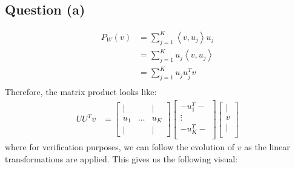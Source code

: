 \documentclass[12pt]{article}
\begin{document}
\subsection{Question (a)}
\begin{align*}
    P_{W}(v)
     & = \sum_{j=1}^{K} \left\langle v, u_{j} \right\rangle u_{j} \\
     & = \sum_{j=1}^{K} u_{j} \left\langle v, u_{j} \right\rangle \\
     & = \sum_{j=1}^{K} u_{j} u_{j}^T v                           \\
\end{align*}
Therefore, the matrix product looks like:
\begin{align*}
    UU^Tv & =
    \begin{bmatrix}
        |   &        & |   \\
        u_1 & \ldots & u_K \\
        |   &        & |
    \end{bmatrix}
    \begin{bmatrix}
        - u_1^T   - \\
        \vdots      \\
        - u_K^T   - \\
    \end{bmatrix}
    \begin{bmatrix}
        | \\
        v \\
        | \\
    \end{bmatrix}
\end{align*}
where for verification purposes, we can follow the evolution of \(v\) as the linear transformations are applied. This gives us the following visual:
\end{document}
